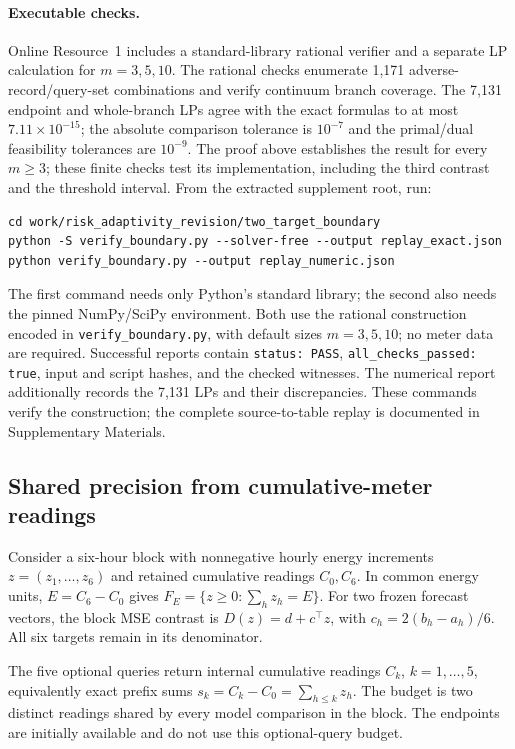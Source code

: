 \documentclass[12pt]{article}
\begin{document}
\paragraph{Executable checks.}
Online Resource~1 includes a standard-library rational verifier and a
separate LP calculation for $m=3,5,10$. The rational checks enumerate
1,171 adverse-record/query-set combinations and verify continuum branch
coverage. The 7,131 endpoint and whole-branch LPs agree with the exact
formulas to at most $7.11\times10^{-15}$; the absolute comparison tolerance
is $10^{-7}$ and the primal/dual feasibility tolerances are $10^{-9}$.
The proof above establishes the result for every $m\geq3$; these finite
checks test its implementation, including the third contrast and the
threshold interval. From the extracted supplement root, run:
\begin{verbatim}
cd work/risk_adaptivity_revision/two_target_boundary
python -S verify_boundary.py --solver-free --output replay_exact.json
python verify_boundary.py --output replay_numeric.json
\end{verbatim}
The first command needs only Python's standard library; the second also
needs the pinned NumPy/SciPy environment. Both use the rational construction
encoded in \texttt{verify\_boundary.py}, with default sizes $m=3,5,10$;
no meter data are required. Successful reports contain
\texttt{status: PASS}, \texttt{all\_checks\_passed: true}, input and script
hashes, and the checked witnesses. The numerical report additionally records
the 7,131 LPs and their discrepancies. These commands verify the construction;
the complete source-to-table replay is documented in Supplementary Materials.
\subsection{Shared precision from cumulative-meter readings}
\label{sec:counter-precision-method}
Consider a six-hour block with nonnegative hourly energy increments
$z=(z_1,\ldots,z_6)$ and retained cumulative readings $C_0,C_6$.
In common energy units, $E=C_6-C_0$ gives
$F_E=\{z\geq0:\sum_hz_h=E\}$. For two frozen forecast vectors,
the block MSE contrast is $D(z)=d+c^\top z$, with
$c_h=2(b_h-a_h)/6$. All six targets remain in its denominator.

The five optional queries return internal cumulative readings $C_k$,
$k=1,\ldots,5$, equivalently exact prefix sums
$s_k=C_k-C_0=\sum_{h\leq k}z_h$. The budget is two distinct readings
shared by every model comparison in the block. The endpoints are initially
available and do not use this optional-query budget.
\end{document}
